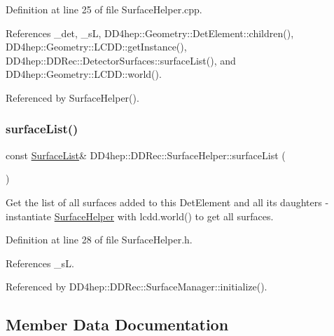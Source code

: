 Definition at line 25 of file Surface\+Helper.\+cpp.



References \+\_\+det, \+\_\+sL, D\+D4hep\+::\+Geometry\+::\+Det\+Element\+::children(), D\+D4hep\+::\+Geometry\+::\+L\+C\+D\+D\+::get\+Instance(), D\+D4hep\+::\+D\+D\+Rec\+::\+Detector\+Surfaces\+::surface\+List(), and D\+D4hep\+::\+Geometry\+::\+L\+C\+D\+D\+::world().



Referenced by Surface\+Helper().

\hypertarget{class_d_d4hep_1_1_d_d_rec_1_1_surface_helper_afd1438e4c040058aac95a8af0167c91d}{}\label{class_d_d4hep_1_1_d_d_rec_1_1_surface_helper_afd1438e4c040058aac95a8af0167c91d} 
\subsubsection{\texorpdfstring{surface\+List()}{surfaceList()}}
{\footnotesize\ttfamily const \hyperlink{class_d_d4hep_1_1_d_d_rec_1_1_surface_list}{Surface\+List}\& D\+D4hep\+::\+D\+D\+Rec\+::\+Surface\+Helper\+::surface\+List (\begin{DoxyParamCaption}{ }\end{DoxyParamCaption})\hspace{0.3cm}{\ttfamily [inline]}}

Get the list of all surfaces added to this Det\+Element and all its daughters -\/ instantiate \hyperlink{class_d_d4hep_1_1_d_d_rec_1_1_surface_helper}{Surface\+Helper} with lcdd.\+world() to get all surfaces. 

Definition at line 28 of file Surface\+Helper.\+h.



References \+\_\+sL.



Referenced by D\+D4hep\+::\+D\+D\+Rec\+::\+Surface\+Manager\+::initialize().



\subsection{Member Data Documentation}
\hypertarget{class_d_d4hep_1_1_d_d_rec_1_1_surface_helper_a879149ec569894c3080e2e0f3464dd8d}{}\label{class_d_d4hep_1_1_d_d_rec_1_1_surface_helper_a879149ec569894c3080e2e0f3464dd8d} 
